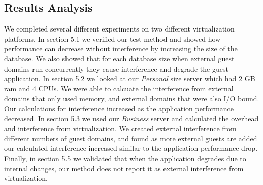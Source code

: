 \subsection{Results Analysis}
We completed several different experiments on two different virtualization platforms.  In section 5.1 we verified our test method and showed how performance can decrease without interference by increasing the size of the database.  We also showed that for each database size when external guest domains run concurrently they cause interference and degrade the guest application.  In section 5.2 we looked at our \emph{Personal} size server which had 2 GB ram and 4 CPUs.  We were able to calcuate the interference from external domains that only used memory, and external domains that were also I/O bound.  Our calculations for interference increased as the application performance decreased.  In section 5.3 we used our \emph{Business} server and calculated the overhead and interference from virtualization.  We created external interference from different numbers of guest domains, and found as more external guests are added our calculated interference increased similar to the application performance drop.  Finally, in section 5.5 we validated that when the application degrades due to internal changes, our method does not report it as external interference from virtualization.



